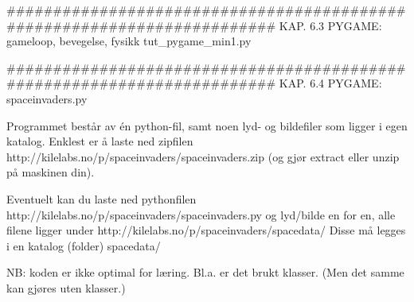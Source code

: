 ######################################################################## 
KAP. 6.3  PYGAME: gameloop, bevegelse, fysikk
tut_pygame_min1.py

######################################################################## 
KAP. 6.4  PYGAME: spaceinvaders.py 

Programmet består av én python-fil, samt noen lyd- og bildefiler 
som ligger i egen katalog. 
Enklest er å laste ned zipfilen 
http://kilelabs.no/p/spaceinvaders/spaceinvaders.zip 
(og gjør extract eller unzip på maskinen din). 

Eventuelt kan du laste ned pythonfilen 
http://kilelabs.no/p/spaceinvaders/spaceinvaders.py
og lyd/bilde en for en, alle filene ligger under
http://kilelabs.no/p/spaceinvaders/spacedata/
Disse må legges i en katalog (folder) spacedata/

NB: koden er ikke optimal for læring. 
Bl.a. er det brukt klasser. 
(Men det samme kan gjøres uten klasser.) 

\fi